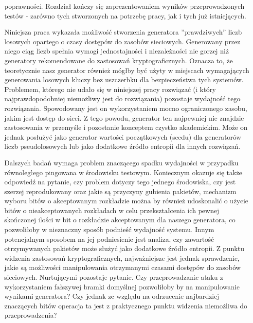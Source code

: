 poprawności. Rozdział kończy się zaprezentowaniem wyników przeprowadzonych testów - zarówno tych stworzonych na potrzebę pracy, jak i tych już istniejących.\par
Niniejsza praca wykazała możliwość stworzenia generatora ''prawdziwych'' liczb losowych opartego o czasy dostępów do zasobów sieciowych. Generowany przez niego ciąg liczb spełnia wymogi jednostajności i niezależności nie gorzej niż generatory rekomendowane do zastosowań kryptograficznych. Oznacza to, że teoretycznie nasz generator również mógłby być użyty w miejscach wymagających generowania losowych kluczy bez uszczerbku dla bezpieczeństwa tych systemów. Problemem, którego nie udało się w niniejszej pracy rozwiązać (i który najprawdopodobniej niemożliwy jest do rozwiązania) pozostaje wydajność tego rozwiązania. Spowodowany jest on wykorzystaniem mocno ograniczonego zasobu, jakim jest dostęp do sieci. Z tego powodu, generator ten najpewniej nie znajdzie zastosowania w przemyśle i pozostanie konceptem czystko akademickim. Może on jednak posłużyć jako generator wartości początkowych (seedu) dla generatorów liczb pseudolosowych lub jako dodatkowe źródło entropii dla innych rozwiązań. \par
Dalszych badań wymaga problem znaczącego spadku wydajności w przypadku równoległego pingowana w środowisku testowym. Koniecznym okazuje się także odpowiedź na pytanie, czy problem dotyczy tego jednego środowiska, czy jest szerzej reprodukowany oraz jakie są przyczyny gubienia pakietów, mechanizm wyboru bitów o akceptowanym rozkładzie można by również udoskonalić o użycie bitów o nieakceptowanych rozkładach w celu przekształcenia ich pewnej skończonej ilości w bit o rozkładzie akceptowanym dla naszego generatora, co pozwoliłoby w nieznaczny sposób podnieść wydajność systemu. Innym potencjalnym sposobem na jej podniesienie jest analiza, czy zawartość otrzymywanych pakietów może służyć jako dodatkowe źródło entropii. Z punktu widzenia zastosowań kryptograficznych, najważniejsze jest jednak sprawdzenie, jakie są możliwości manipulowania otrzymanymi czasami dostępów do zasobów sieciowych. Nurtującymi pozostaje pytanie. Czy przeprowadzanie ataku z wykorzystaniem fałszywej bramki domyślnej pozwoliłoby by na manipulowanie wynikami generatora? Czy jednak ze względu na odrzucenie najbardziej znaczących bitów operacja ta jest z praktycznego punktu widzenia niemożliwa do przeprowadzenia?




